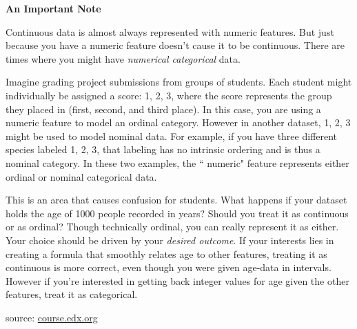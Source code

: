\documentclass{article}
\begin{document}
{\bf{An Important Note}}

Continuous data is almost always represented with numeric features. But just because you have a numeric feature doesn't cause it to be continuous. There are times where you might have {\it{numerical categorical}} data.

Imagine grading project submissions from groups of students. Each student might individually be assigned a score: 1, 2, 3, where the score represents the group they placed in (first, second, and third place). In this case, you are using a numeric feature to model an ordinal category. However in another dataset, 1, 2, 3 might be used to model nominal data. For example, if you have three different species labeled 1, 2, 3, that labeling has no intrinsic ordering and is thus a nominal category. In these two examples, the ``
numeric" feature represents either ordinal or nominal categorical data.

This is an area that causes confusion for students. What happens if your dataset holds the age of 1000 people recorded in years? Should you treat it as continuous or as ordinal? Though technically ordinal, you can really represent it as either. Your choice should be driven by your {\it{desired outcome}}. If your interests lies in creating a formula that smoothly relates age to other features, treating it as continuous is more correct, even though you were given age-data in intervals. However if you're interested in getting back integer values for age given the other features, treat it as categorical.
  
\begin{flushright}
    source: \href{https://courses.edx.org/courses/course-v1:Microsoft+DAT210x+6T2016/courseware/12621a4064aa4d92874a9d8a953734c5/dfc5af6b20e548b4a62b59b73d71d9bd/}{course.edx.org}  
\end{flushright}
\end{document}
